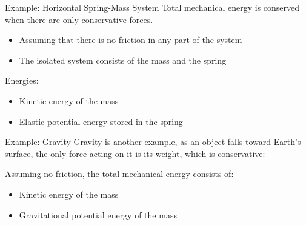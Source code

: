 \documentclass[12pt,compress,aspectratio=169]{beamer}
\begin{document}
\begin{frame}{Example: Horizontal Spring-Mass System}
  Total mechanical energy is conserved when there are only conservative forces.
  \begin{itemize}
  \item Assuming that there is no friction in any part of the system
  \item The isolated system consists of the mass and the spring
  \end{itemize}  
  Energies:
  \begin{itemize}
  \item Kinetic energy of the mass
  \item Elastic potential energy stored in the spring
  \end{itemize}
  \begin{center}
  \end{center}
\end{frame}



\begin{frame}{Example: Gravity}
  Gravity is another example, as an object falls toward Earth's surface,
  the only force acting on it is its weight, which is conservative:
  \begin{center}
  \end{center}
  Assuming no friction, the total mechanical energy consists of:
  \begin{itemize}
  \item Kinetic energy of the mass
  \item Gravitational potential energy of the mass
  \end{itemize}
\end{frame}
\end{document}
